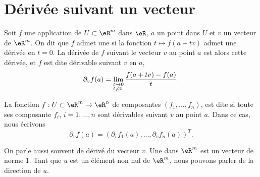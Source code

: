 \section{Dérivée suivant un vecteur}		\label{SecDerDirect}
\begin{definition}
Soit $f$ une application de $U\subset\eR^m$ dans $\eR$, $a$ un point dans $U$ et $v$ un vecteur de $\eR^m$. On dit que $f$ admet une  si la fonction $t\mapsto f(a+tv)$ admet une dérivée en $t=0$. La  dérivée de $f$ suivant le vecteur $v$ au point $a$ est alors cette dérivée, et $f$ est dite dérivable suivant $v$ en $a$,
\[
\partial_v f(a)=\lim_{
  \begin{subarray}{l}
    t\to 0\\ t\neq 0 
  \end{subarray}
 }\frac{f(a+tv)-f(a)}{t}.
\] 
\end{definition}

\begin{definition}
  La fonction $f:U\subset\eR^m\to \eR^n$ de composantes $(f_1,\ldots, f_n)$, est dite  si toute ses composante $f_i$, $i=1,\ldots, n$ sont dérivables suivant $v$ au point $a$. Dans ce cas, nous écrivons
  \begin{equation}
	\partial_v f(a)=\left(\partial_v f_1(a), \ldots, \partial_v f_n(a)\right)^T.
  \end{equation}
\end{definition}
On parle aussi souvent de dérivé  du vecteur $v$. Une  dans $\eR^m$ est un vecteur de norme $1$. Tant que $u$ est un élément non nul de $\eR^m$, nous pouvons parler de la direction de $u$.

